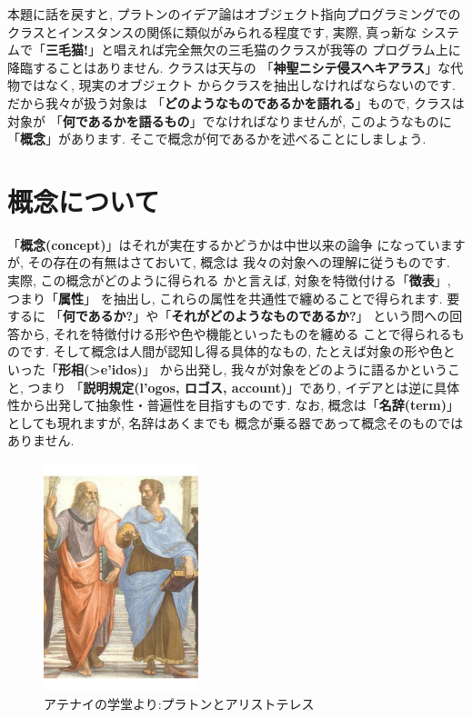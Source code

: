 \documentclass[b5j,8pt,twocolumn]{ltjsarticle}
\newcommand{\textgreek}[1]{\begingroup\fontencoding{LGR}\selectfont#1\endgroup}
\begin{document}
本題に話を戻すと, プラトンのイデア論はオブジェクト指向プログラミングでの
クラスとインスタンスの関係に類似がみられる程度です, 実際, 真っ新な
システムで「\textbf{三毛猫!}」と唱えれば完全無欠の三毛猫のクラスが我等の
プログラム上に降臨することはありません. クラスは天与の
「\textbf{神聖ニシテ侵スヘキアラス}」な代物ではなく, 現実のオブジェクト
からクラスを抽出しなければならないのです. だから我々が扱う対象は
「\textbf{どのようなものであるかを語れる}」もので, クラスは対象が
「\textbf{何であるかを語るもの}」でなければなりませんが, このようなものに
「\textbf{概念}」があります. そこで概念が何であるかを述べることにしましょう.


\section{概念について}

「\textbf{概念(concept)}」はそれが実在するかどうかは中世以来の論争
\cite{普遍論争}になっていますが, その存在の有無はさておいて, 概念は
我々の対象への理解に従うものです. 実際, この概念がどのように得られる
かと言えば, 対象を特徴付ける「\textbf{徴表}」, つまり「\textbf{属性}」
を抽出し, これらの属性を共通性で纏めることで得られます. 要するに
「\textbf{何であるか?}」や「\textbf{それがどのようなものであるか?}」
という問への回答から, それを特徴付ける形や色や機能といったものを纏める
ことで得られるものです. そして概念は人間が認知し得る具体的なもの,
 たとえば対象の形や色といった「\textbf{形相(\textgreek{>e'idos})}」
から出発し, 我々が対象をどのように語るかということ, つまり
「\textbf{説明規定(\textgreek{l'ogos}, ロゴス, account)}」であり,
 イデアとは逆に具体性から出発して抽象性・普遍性を目指すものです. なお,
 概念は「\textbf{名辞(term)}」としても現れますが, 名辞はあくまでも
概念が乗る器であって概念そのものではありません.
\newline

\begin{figure}
\includegraphics[width=4.5cm]{Plato_and_Aristotle_in_The_School_of_Athens,_by_italian_Rafael.pdf}
\caption{アテナイの学堂より:プラトンとアリストテレス}
\label{fig:Plato-Aristotle}
\end{figure}
\end{document}
